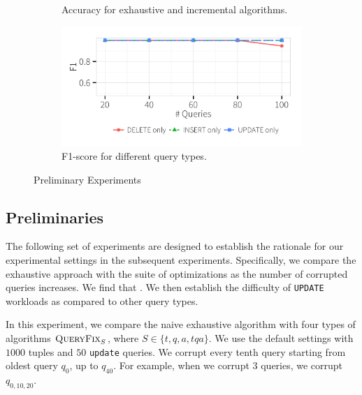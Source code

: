 \begin{figure}[h]
\begin{subfigure}[t]{.3\textwidth}
    \vspace*{-.1in}
    \caption{Accuracy for exhaustive and incremental algorithms.}
    \label{f:singlequeryinc_acc} 
    \end{subfigure}
    \begin{subfigure}[t]{.3\textwidth}
    \includegraphics[width = .99\columnwidth]{figures/indelup_acc}
    \vspace*{-.1in}
    \caption{F1-score for different query types.}
    \label{f:qtype} 
    \end{subfigure}
    \vspace*{-.1in}
    \caption{Preliminary Experiments}
  \end{figure}


\subsection{Preliminaries}
The following set of experiments are designed to establish the rationale for 
our experimental settings in the subsequent experiments.  
Specifically, we compare the exhaustive approach with the suite of optimizations
as the number of corrupted queries increases.  
We find that .
We then establish the difficulty of \texttt{UPDATE} workloads as compared to other query types.



In this experiment, we compare the naive exhaustive algorithm with four types of algorithms
$\textsc{QueryFix}_S$, where $S \in \{t, q, a, tqa\}$.  We use the default settings with $1000$ tuples and
$50$ \texttt{update} queries.  We corrupt every tenth query starting from oldest query $q_0$,
up to $q_{40}$.  For example, when we corrupt $3$ queries, we corrupt $q_{0,10,20}$.


